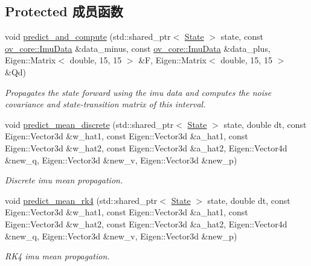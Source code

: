 \subsection*{Protected 成员函数}
\begin{DoxyCompactItemize}
\item 
void \hyperlink{classov__msckf_1_1Propagator_a3e7cfb88ec2c5eb7e090e0e6fe48225e}{predict\+\_\+and\+\_\+compute} (std\+::shared\+\_\+ptr$<$ \hyperlink{classov__msckf_1_1State}{State} $>$ state, const \hyperlink{structov__core_1_1ImuData}{ov\+\_\+core\+::\+Imu\+Data} \&data\+\_\+minus, const \hyperlink{structov__core_1_1ImuData}{ov\+\_\+core\+::\+Imu\+Data} \&data\+\_\+plus, Eigen\+::\+Matrix$<$ double, 15, 15 $>$ \&F, Eigen\+::\+Matrix$<$ double, 15, 15 $>$ \&Qd)
\begin{DoxyCompactList}\small\item\em Propagates the state forward using the imu data and computes the noise covariance and state-\/transition matrix of this interval. \end{DoxyCompactList}\item 
void \hyperlink{classov__msckf_1_1Propagator_a038285deaa51724081651471a8de298f}{predict\+\_\+mean\+\_\+discrete} (std\+::shared\+\_\+ptr$<$ \hyperlink{classov__msckf_1_1State}{State} $>$ state, double dt, const Eigen\+::\+Vector3d \&w\+\_\+hat1, const Eigen\+::\+Vector3d \&a\+\_\+hat1, const Eigen\+::\+Vector3d \&w\+\_\+hat2, const Eigen\+::\+Vector3d \&a\+\_\+hat2, Eigen\+::\+Vector4d \&new\+\_\+q, Eigen\+::\+Vector3d \&new\+\_\+v, Eigen\+::\+Vector3d \&new\+\_\+p)
\begin{DoxyCompactList}\small\item\em Discrete imu mean propagation. \end{DoxyCompactList}\item 
void \hyperlink{classov__msckf_1_1Propagator_abfc8dcea867622ef57e740e5ab884538}{predict\+\_\+mean\+\_\+rk4} (std\+::shared\+\_\+ptr$<$ \hyperlink{classov__msckf_1_1State}{State} $>$ state, double dt, const Eigen\+::\+Vector3d \&w\+\_\+hat1, const Eigen\+::\+Vector3d \&a\+\_\+hat1, const Eigen\+::\+Vector3d \&w\+\_\+hat2, const Eigen\+::\+Vector3d \&a\+\_\+hat2, Eigen\+::\+Vector4d \&new\+\_\+q, Eigen\+::\+Vector3d \&new\+\_\+v, Eigen\+::\+Vector3d \&new\+\_\+p)
\begin{DoxyCompactList}\small\item\em R\+K4 imu mean propagation. \end{DoxyCompactList}\end{DoxyCompactItemize}
